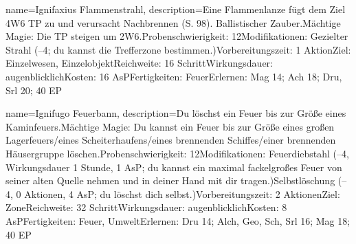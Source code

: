 {
    name={Ignifaxius Flammenstrahl},
    description={Eine Flammenlanze fügt dem Ziel 4W6 TP zu und verursacht Nachbrennen (S. 98). Ballistischer Zauber.\newline Mächtige Magie: Die TP steigen um 2W6.\newline Probenschwierigkeit: 12\newline Modifikationen: Gezielter Strahl (–4; du kannst die Trefferzone bestimmen.)\newline Vorbereitungszeit: 1 Aktion\newline Ziel: Einzelwesen, Einzelobjekt\newline Reichweite: 16 Schritt\newline Wirkungsdauer: augenblicklich\newline Kosten: 16 AsP\newline Fertigkeiten: Feuer\newline Erlernen: Mag 14; Ach 18; Dru, Srl 20; 40 EP}
}


{
    name={Ignifugo Feuerbann},
    description={Du löschst ein Feuer bis zur Größe eines Kaminfeuers.\newline Mächtige Magie: Du kannst ein Feuer bis zur Größe eines großen Lagerfeuers/eines Scheiterhaufens/eines brennenden Schiffes/einer brennenden Häusergruppe löschen.\newline Probenschwierigkeit: 12\newline Modifikationen: Feuerdiebstahl (–4, Wirkungsdauer 1 Stunde, 1 AsP; du kannst ein maximal fackelgroßes Feuer von seiner alten Quelle nehmen und in deiner Hand mit dir tragen.)\newline Selbstlöschung (–4, 0 Aktionen, 4 AsP; du löschst dich selbst.)\newline Vorbereitungszeit: 2 Aktionen\newline Ziel: Zone\newline Reichweite: 32 Schritt\newline Wirkungsdauer: augenblicklich\newline Kosten: 8 AsP\newline Fertigkeiten: Feuer, Umwelt\newline Erlernen: Dru 14; Alch, Geo, Sch, Srl 16; Mag 18; 40 EP}
}


